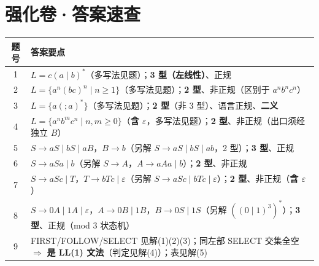 \documentclass[12pt,a4paper,fontset=windows]{ctexart}
\newcommand{\imp}{\ensuremath{\Rightarrow}}
\begin{document}
\section{强化卷·答案速查}

\begin{center}
\renewcommand{\arraystretch}{1.3}
\setlength{\tabcolsep}{6pt}
\begin{tabular}{@{}c p{13.6cm}@{}}
\toprule
\textbf{题号} & \textbf{答案要点} \\
\midrule
1 & $L = c(a \mid b)^*$（多写法见题）；\textbf{3 型（左线性）}、正规 \\
2 & $L = \{a^n (bc)^n \mid n \ge 1\}$（多写法见题）；\textbf{2 型}、非正规（区别于 $a^n b^n c^n$） \\
3 & $L = \{a( ; a)^*\}$（多写法见题）；\textbf{2 型}（非 3 型）、语言正规、\textbf{二义} \\
4 & $L = \{a^n b^m c^n \mid n,m \ge 0\}$（\textbf{含 $\varepsilon$}，多写法见题）；\textbf{2 型}、非正规（出口须经独立 $B$） \\
5 & $S \to aS \mid bS \mid aB$，$B \to b$（另解 $S \to aS \mid bS \mid ab$，2 型）；\textbf{3 型}、正规 \\
6 & $S \to aSa \mid b$（另解 $S \to A$，$A \to aAa \mid b$）；\textbf{2 型}、非正规 \\
7 & $S \to aSc \mid T$，$T \to bTc \mid \varepsilon$（另解 $S \to aSc \mid bTc \mid \varepsilon$）；\textbf{2 型}、非正规（\textbf{含 $\varepsilon$}） \\
8 & $S \to 0A \mid 1A \mid \varepsilon$，$A \to 0B \mid 1B$，$B \to 0S \mid 1S$（另解 $((0 \mid 1)^3)^*$）；\textbf{3 型}、正规（mod 3 状态机） \\
9 & FIRST/FOLLOW/SELECT 见解(1)(2)(3)；同左部 SELECT 交集全空 \imp{} \textbf{是 LL(1) 文法}（判定见解(4)）；表见解(5) \\
\bottomrule
\end{tabular}
\end{center}
\end{document}
